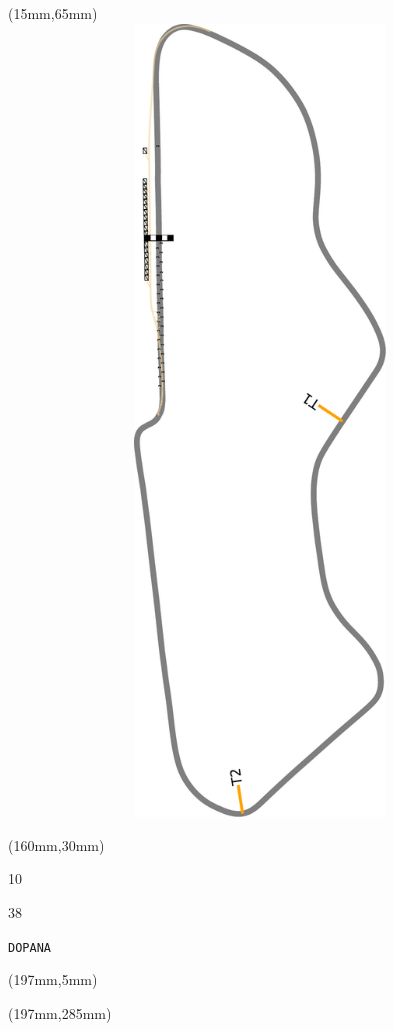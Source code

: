 \begin{textblock*}{185mm}(15mm,65mm)%
\centering
\mbox{\includegraphics[width=185mm,height=210mm,keepaspectratio]{PT/DOPANA.pdf}}
\end{textblock*}
\begin{textblock*}{40mm}(160mm,30mm)%
\Large
\par{} 
\par10 
\par38 
\par\hfill\tiny\tt DOPANA\\
\end{textblock*}
\begin{textblock*}{20mm}(197mm,5mm)%
\fbox{\thepage}
\label{DOPANA}
\end{textblock*}
\begin{textblock*}{20mm}(197mm,285mm)%
\fbox{\thepage}
\end{textblock*}

